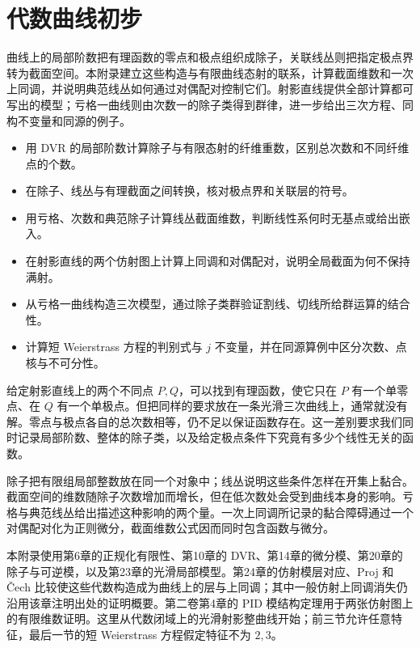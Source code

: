 
\chapter{代数曲线初步}
\label{b3:app:H}

\begin{chapterabstract}
	曲线上的局部阶数把有理函数的零点和极点组织成除子，关联线丛则把指定极点界转为截面空间。本附录建立这些构造与有限曲线态射的联系，计算截面维数和一次上同调，并说明典范线丛如何通过对偶配对控制它们。射影直线提供全部计算都可写出的模型；亏格一曲线则由次数一的除子类得到群律，进一步给出三次方程、同构不变量和同源的例子。
\end{chapterabstract}

\begin{learninggoals}
	\begin{itemize}
		\item 用 DVR 的局部阶数计算除子与有限态射的纤维重数，区别总次数和不同纤维点的个数。
		\item 在除子、线丛与有理截面之间转换，核对极点界和关联层的符号。
		\item 用亏格、次数和典范除子计算线丛截面维数，判断线性系何时无基点或给出嵌入。
		\item 在射影直线的两个仿射图上计算上同调和对偶配对，说明全局截面为何不保持满射。
		\item 从亏格一曲线构造三次模型，通过除子类群验证割线、切线所给群运算的结合性。
		\item 计算短 Weierstrass 方程的判别式与 \(j\) 不变量，并在同源算例中区分次数、点核与不可分性。
	\end{itemize}
\end{learninggoals}

给定射影直线上的两个不同点 \(P,Q\)，可以找到有理函数，使它只在 \(P\) 有一个单零点、在 \(Q\) 有一个单极点。但把同样的要求放在一条光滑三次曲线上，通常就没有解。零点与极点各自的总次数相等，仍不足以保证函数存在。这一差别要求我们同时记录局部阶数、整体的除子类，以及给定极点条件下究竟有多少个线性无关的函数。

\ProseParagraphBreak
除子把有限组局部整数放在同一个对象中；线丛说明这些条件怎样在开集上黏合。截面空间的维数随除子次数增加而增长，但在低次数处会受到曲线本身的影响。亏格与典范线丛给出描述这种影响的两个量。一次上同调所记录的黏合障碍通过一个对偶配对化为正则微分，截面维数公式因而同时包含函数与微分。

\ProseParagraphBreak
本附录使用第6章的正规化有限性、第10章的 DVR、第14章的微分模、第20章的除子与可逆模，以及第23章的光滑局部模型。第24章的仿射模层对应、Proj 和 Čech 比较使这些代数构造成为曲线上的层与上同调；其中一般仿射上同调消失仍沿用该章注明出处的证明概要。第二卷第4章的 PID 模结构定理用于两张仿射图上的有限维数证明。这里从代数闭域上的光滑射影整曲线开始；前三节允许任意特征，最后一节的短 Weierstrass 方程假定特征不为 \(2,3\)。

